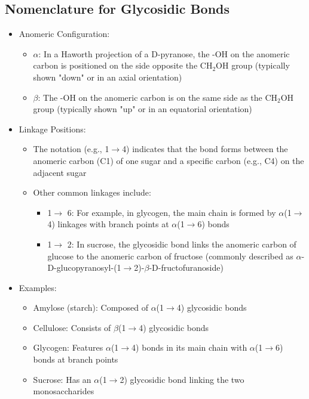 \documentclass[10pt]{article}
\begin{document}
\subsection*{Nomenclature for Glycosidic Bonds}
\begin{itemize}
    \item Anomeric Configuration:
    \begin{itemize}
        \item $\alpha$: In a Haworth projection of a D-pyranose, the -OH on the anomeric carbon is positioned on the side opposite the CH$_2$OH group (typically shown "down" or in an axial orientation)
        \item $\beta$: The -OH on the anomeric carbon is on the same side as the CH$_2$OH group (typically shown "up" or in an equatorial orientation)
    \end{itemize}
    \item Linkage Positions:
    \begin{itemize}
        \item The notation (e.g., 1$\rightarrow$4) indicates that the bond forms between the anomeric carbon (C1) of one sugar and a specific carbon (e.g., C4) on the adjacent sugar
        \item Other common linkages include:
        \begin{itemize}
            \item 1$ \rightarrow$ 6: For example, in glycogen, the main chain is formed by $\alpha$(1$\rightarrow$4) linkages with branch points at $\alpha$(1$\rightarrow$6) bonds
            \item 1$\rightarrow$ 2: In sucrose, the glycosidic bond links the anomeric carbon of glucose to the anomeric carbon of fructose (commonly described as $\alpha$-D-glucopyranosyl-(1$\rightarrow$2)-$\beta$-D-fructofuranoside)
        \end{itemize}
    \end{itemize}
    \item Examples:
    \begin{itemize}
        \item Amylose (starch): Composed of $\alpha$(1$\rightarrow$4) glycosidic bonds
        \item Cellulose: Consists of $\beta$(1$\rightarrow$4) glycosidic bonds
        \item Glycogen: Features $\alpha$(1$\rightarrow$4) bonds in its main chain with $\alpha$(1$\rightarrow$6) bonds at branch points
        \item Sucrose: Has an $\alpha$(1$\rightarrow$2) glycosidic bond linking the two monosaccharides
    \end{itemize}
\end{itemize}
\end{document}
